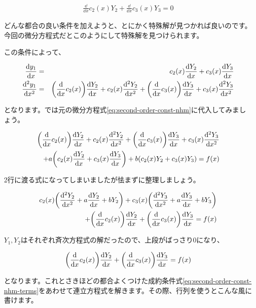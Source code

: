 \begin{eqnarray}
    \frac{\dd}{\dd x}c_2(x)Y_2+\frac{\dd}{\dd x}c_3(x)Y_3=0
    \label{eq:second-order-const-nhm-terms}
\end{eqnarray}

どんな都合の良い条件を加えようと、とにかく特殊解が見つかれば良いのです。今回の微分方程式だとこのようにして特殊解を見つけられます。

この条件によって、

\begin{eqnarray}
    \frac{\dd y_1}{\dd x}&=&c_2(x)\frac{\dd Y_2}{\dd x}+c_3(x)\frac{\dd Y_3}{\dd x} \\
    \frac{\dd^2 y_1}{\dd x^2}&=&\pqty{\frac{\dd}{\dd x}c_2(x)}\frac{\dd Y_2}{\dd x}+c_2(x)\frac{\dd^2 Y_2}{\dd x^2}+\pqty{\frac{\dd}{\dd x}c_3(x)}\frac{\dd Y_3}{\dd x}+c_3(x)\frac{\dd^2 Y_3}{\dd x^2}
\end{eqnarray}

\noindent
となります。では元の微分方程式\ref{eq:second-order-const-nhm}に代入してみましょう。

\begin{eqnarray}
    \pqty{\frac{\dd}{\dd x}c_2(x)}\frac{\dd Y_2}{\dd x}+c_2(x)\frac{\dd^2 Y_2}{\dd x^2}+\pqty{\frac{\dd}{\dd x}c_3(x)}\frac{\dd Y_3}{\dd x}+c_3(x)\frac{\dd^2 Y_3}{\dd x^2} \nonumber \\
    +a\pqty{c_2(x)\frac{\dd Y_2}{\dd x}+c_3(x)\frac{\dd Y_3}{\dd x}}+b(c_2(x)Y_2+c_3(x)Y_3)=f(x)
\end{eqnarray}

2行に渡る式になってしまいましたが怯まずに整理しましょう。

\begin{eqnarray}
    c_2(x)\pqty{\frac{\dd^2 Y_2}{\dd x^2}+a\frac{\dd Y_2}{\dd x}+bY_2}+c_3(x)\pqty{\frac{\dd^2 Y_3}{\dd x^2}+a\frac{\dd Y_3}{\dd x}+bY_3} \nonumber \\
    +\pqty{\frac{\dd}{\dd x}c_2(x)}\frac{\dd Y_2}{\dd x}+\pqty{\frac{\dd}{\dd x}c_3(x)}\frac{\dd Y_3}{\dd x}=f(x)
\end{eqnarray}

$Y_1,Y_2$はそれぞれ斉次方程式の解だったので、上段がばっさり0になり、

\begin{eqnarray}
    \pqty{\frac{\dd}{\dd x}c_2(x)}\frac{\dd Y_2}{\dd x}+\pqty{\frac{\dd}{\dd x}c_3(x)}\frac{\dd Y_3}{\dd x}=f(x)
\end{eqnarray}

となります。これとさきほどの都合よくつけた成約条件式\ref{eq:second-order-const-nhm-terms}をあわせて連立方程式を解きます。その際、行列を使うとこんな風に書けます。

